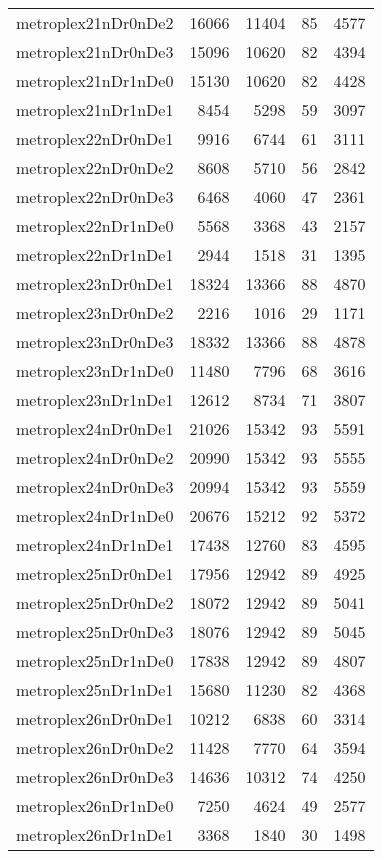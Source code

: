 \begin{longtable}{lrrrr}
metroplex21nDr0nDe2 & 16066 & 11404 & 85 & 4577 \\
metroplex21nDr0nDe3 & 15096 & 10620 & 82 & 4394 \\
metroplex21nDr1nDe0 & 15130 & 10620 & 82 & 4428 \\
metroplex21nDr1nDe1 & 8454 & 5298 & 59 & 3097 \\
metroplex22nDr0nDe1 & 9916 & 6744 & 61 & 3111 \\
metroplex22nDr0nDe2 & 8608 & 5710 & 56 & 2842 \\
metroplex22nDr0nDe3 & 6468 & 4060 & 47 & 2361 \\
metroplex22nDr1nDe0 & 5568 & 3368 & 43 & 2157 \\
metroplex22nDr1nDe1 & 2944 & 1518 & 31 & 1395 \\
metroplex23nDr0nDe1 & 18324 & 13366 & 88 & 4870 \\
metroplex23nDr0nDe2 & 2216 & 1016 & 29 & 1171 \\
metroplex23nDr0nDe3 & 18332 & 13366 & 88 & 4878 \\
metroplex23nDr1nDe0 & 11480 & 7796 & 68 & 3616 \\
metroplex23nDr1nDe1 & 12612 & 8734 & 71 & 3807 \\
metroplex24nDr0nDe1 & 21026 & 15342 & 93 & 5591 \\
metroplex24nDr0nDe2 & 20990 & 15342 & 93 & 5555 \\
metroplex24nDr0nDe3 & 20994 & 15342 & 93 & 5559 \\
metroplex24nDr1nDe0 & 20676 & 15212 & 92 & 5372 \\
metroplex24nDr1nDe1 & 17438 & 12760 & 83 & 4595 \\
metroplex25nDr0nDe1 & 17956 & 12942 & 89 & 4925 \\
metroplex25nDr0nDe2 & 18072 & 12942 & 89 & 5041 \\
metroplex25nDr0nDe3 & 18076 & 12942 & 89 & 5045 \\
metroplex25nDr1nDe0 & 17838 & 12942 & 89 & 4807 \\
metroplex25nDr1nDe1 & 15680 & 11230 & 82 & 4368 \\
metroplex26nDr0nDe1 & 10212 & 6838 & 60 & 3314 \\
metroplex26nDr0nDe2 & 11428 & 7770 & 64 & 3594 \\
metroplex26nDr0nDe3 & 14636 & 10312 & 74 & 4250 \\
metroplex26nDr1nDe0 & 7250 & 4624 & 49 & 2577 \\
metroplex26nDr1nDe1 & 3368 & 1840 & 30 & 1498 \\

\end{longtable}
